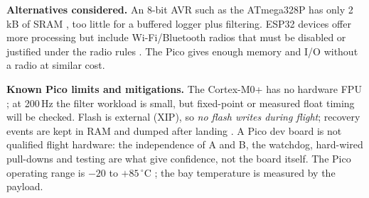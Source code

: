 \textbf{Alternatives considered.} An 8-bit AVR such as the ATmega328P has only 2\,kB of SRAM \cite{atmega328ds}, too little for a buffered logger plus filtering. ESP32 devices offer more processing but include Wi-Fi/Bluetooth radios \cite{esp32ds} that must be disabled or justified under the radio rules \cite{rtc2027app03}. The Pico gives enough memory and I/O without a radio at similar cost.

\textbf{Known Pico limits and mitigations.} The Cortex-M0+ has no hardware FPU \cite{rp2040ds}; at 200\,Hz the filter workload is small, but fixed-point or measured float timing will be checked. Flash is external (XIP), so \emph{no flash writes during flight}; recovery events are kept in RAM and dumped after landing \cite{rp2040ds,picosdk}. A Pico dev board is not qualified flight hardware: the independence of A and B, the watchdog, hard-wired pull-downs and testing are what give confidence, not the board itself. The Pico operating range is $-20$ to $+85\,^{\circ}$C \cite{picods}; the bay temperature is measured by the payload.

